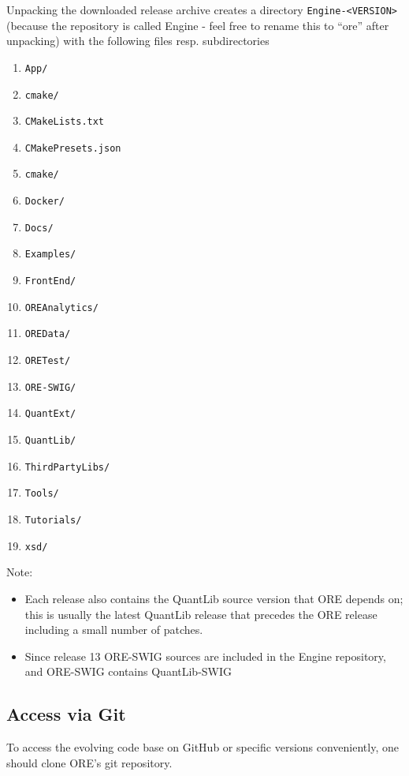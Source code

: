 Unpacking the downloaded release archive creates a directory {\tt Engine-<VERSION>} (because the repository is called Engine -
feel free to rename this to ``ore'' after unpacking) with the following files resp. subdirectories
\begin{enumerate}
\item {\tt App/}
\item {\tt cmake/}
\item {\tt CMakeLists.txt}
\item {\tt CMakePresets.json}
\item {\tt cmake/}
\item {\tt Docker/}
\item {\tt Docs/}
\item {\tt Examples/}
\item {\tt FrontEnd/}
\item {\tt OREAnalytics/}
\item {\tt OREData/}
\item {\tt ORETest/}
\item {\tt ORE-SWIG/}
\item {\tt QuantExt/}
\item {\tt QuantLib/}
\item {\tt ThirdPartyLibs/}
\item {\tt Tools/}
\item {\tt Tutorials/}
\item {\tt xsd/}
\end{enumerate}

Note:
\begin{itemize}
\item Each release also contains the QuantLib source version that ORE depends on; this is usually the latest QuantLib release that precedes the ORE release including a small number of patches.
\item Since release 13 ORE-SWIG sources are included in the Engine repository, and ORE-SWIG contains QuantLib-SWIG
\end{itemize}

\subsection{Access via Git}\label{sec:build_ore}

To access the evolving code base on GitHub or specific versions conveniently, one should clone ORE's git repository.

